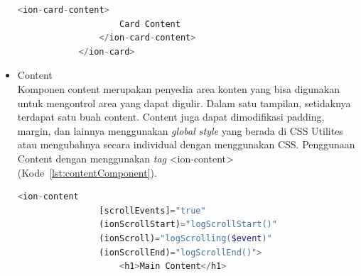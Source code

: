 \begin{itemize}
\begin{lstlisting}[language=php, label={lst:cardComponent}, caption=Potongan Kode Program dari Card Component]
				<ion-card-content>
					Card Content
				</ion-card-content>
			</ion-card>
	\end{lstlisting} 
	\item Content\\
	Komponen content merupakan penyedia area konten yang bisa digunakan untuk mengontrol area yang dapat digulir. Dalam satu tampilan, setidaknya terdapat satu buah content. Content juga dapat dimodifikasi padding, margin, dan lainnya menggunakan {\it global style} yang berada di CSS Utilites atau mengubahnya secara individual dengan menggunakan CSS. Penggunaan Content dengan menggunakan {\it tag} <ion-content> (Kode~\ref{lst:contentComponent}).

	\begin{lstlisting}[language=php, label={lst:contentComponent}, caption=Potongan Kode Program dari Content Component]
			<ion-content
				[scrollEvents]="true"
				(ionScrollStart)="logScrollStart()"
				(ionScroll)="logScrolling($event)"
				(ionScrollEnd)="logScrollEnd()">
					<h1>Main Content</h1>
			

\end{lstlisting}
\end{itemize}
